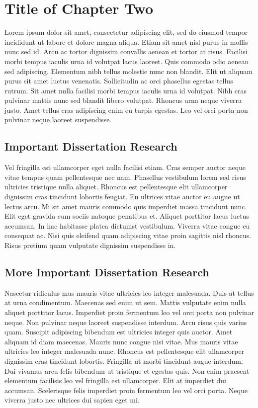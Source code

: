 \chapter{Title of Chapter Two}

Lorem ipsum dolor sit amet, consectetur adipiscing elit, sed do eiusmod tempor incididunt ut labore et dolore magna aliqua. Etiam sit amet nisl purus in mollis nunc sed id. Arcu ac tortor dignissim convallis aenean et tortor at risus. Facilisi morbi tempus iaculis urna id volutpat lacus laoreet. Quis commodo odio aenean sed adipiscing. Elementum nibh tellus molestie nunc non blandit. Elit ut aliquam purus sit amet luctus venenatis. Sollicitudin ac orci phasellus egestas tellus rutrum. Sit amet nulla facilisi morbi tempus iaculis urna id volutpat. Nibh cras pulvinar mattis nunc sed blandit libero volutpat. Rhoncus urna neque viverra justo. Amet tellus cras adipiscing enim eu turpis egestas. Leo vel orci porta non pulvinar neque laoreet suspendisse.

\section{Important Dissertation Research}

Vel fringilla est ullamcorper eget nulla facilisi etiam. Cras semper auctor neque vitae tempus quam pellentesque nec nam. Phasellus vestibulum lorem sed risus ultricies tristique nulla aliquet. Rhoncus est pellentesque elit ullamcorper dignissim cras tincidunt lobortis feugiat. Eu ultrices vitae auctor eu augue ut lectus arcu. Mi sit amet mauris commodo quis imperdiet massa tincidunt nunc. Elit eget gravida cum sociis natoque penatibus et. Aliquet porttitor lacus luctus accumsan. In hac habitasse platea dictumst vestibulum. Viverra vitae congue eu consequat ac. Nisi quis eleifend quam adipiscing vitae proin sagittis nisl rhoncus. Risus pretium quam vulputate dignissim suspendisse in.

\section{More Important Dissertation Research}

Nascetur ridiculus mus mauris vitae ultricies leo integer malesuada. Duis at tellus at urna condimentum. Maecenas sed enim ut sem. Mattis vulputate enim nulla aliquet porttitor lacus. Imperdiet proin fermentum leo vel orci porta non pulvinar neque. Non pulvinar neque laoreet suspendisse interdum. Arcu risus quis varius quam. Suscipit adipiscing bibendum est ultricies integer quis auctor. Amet aliquam id diam maecenas. Mauris nunc congue nisi vitae. Mus mauris vitae ultricies leo integer malesuada nunc. Rhoncus est pellentesque elit ullamcorper dignissim cras tincidunt lobortis. Fringilla ut morbi tincidunt augue interdum. Dui vivamus arcu felis bibendum ut tristique et egestas quis. Non enim praesent elementum facilisis leo vel fringilla est ullamcorper. Elit at imperdiet dui accumsan. Scelerisque felis imperdiet proin fermentum leo vel orci porta. Neque viverra justo nec ultrices dui sapien eget mi.

